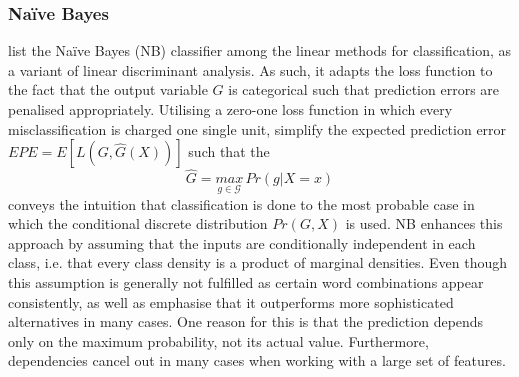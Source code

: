 \subsubsection{Na\"{i}ve Bayes} %

\textcite[p.~211]{Friedman.2001} list the Na\"{i}ve Bayes (NB) classifier among the linear methods for classification, as a variant of linear discriminant analysis. As such, it adapts the loss function to the fact that the output variable $G$ is categorical such that prediction errors are penalised appropriately. Utilising a zero-one loss function in which every misclassification is charged one single unit, \textcite[pp.~20-21]{Friedman.2001} simplify the expected prediction error $EPE=E[L(G,\hat{G}(X))]$ such that the 
%
\begin{equation}
	\hat{G} = \underset{g\in \mathcal{G}}{max}\, Pr(g|X=x)
\end{equation}
%
conveys the intuition that classification is done to the most probable case in which the conditional discrete distribution $Pr(G,X)$ is used. NB enhances this approach by assuming that the inputs are conditionally independent in each class, i.e. that every class density is a product of marginal densities. Even though this assumption is generally not fulfilled as certain word combinations appear consistently, \textcite{Friedman.2001} as well as \textcite{Rish.2001} emphasise that it outperforms more sophisticated alternatives in many cases. One reason for this is that the prediction depends only on the maximum probability, not its actual value. Furthermore, dependencies cancel out in many cases when working with a large set of features. 

%
